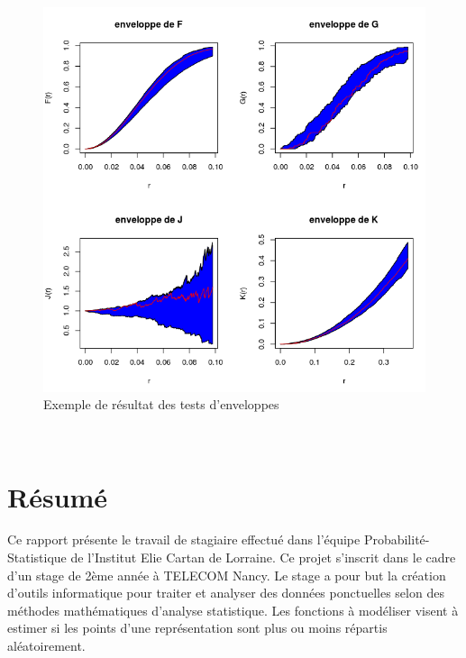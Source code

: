 \documentclass[stage2a]{tnreport}
\begin{document}
\vspace*{2cm}
\begin{center}
\begin{figure}[h]
  \centering
  \includegraphics[scale=0.7]{figures/calculEnveloppes.png}
  \caption{Exemple de résultat des tests d'enveloppes}
  \label{fig:testEnveloppe}
\end{figure}
\end{center}
\newpage
~
\newpage

\thispagestyle{empty}

\section*{Résumé}

Ce rapport présente le travail de stagiaire effectué dans l'équipe Probabilité-Statistique de l'Institut Elie Cartan de Lorraine. Ce projet s'inscrit dans le cadre d'un stage de 2ème année à TELECOM Nancy. Le stage a pour but la création d'outils informatique pour traiter et analyser des données ponctuelles selon des méthodes mathématiques d'analyse statistique. Les fonctions à modéliser visent à estimer si les points d'une représentation sont plus ou moins répartis aléatoirement.\\
\end{document}
